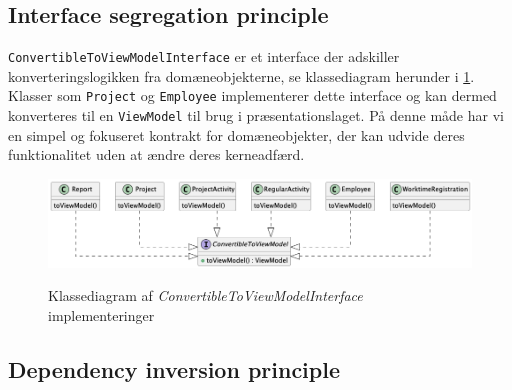 \subsection{Interface segregation principle} \label{sec:solid_i}
\texttt{ConvertibleToViewModelInterface} er et interface der adskiller konverteringslogikken fra domæneobjekterne, se klassediagram herunder i \ref{fig:class_convertible_example}. Klasser som \texttt{Project} og \texttt{Employee} implementerer dette interface og kan dermed konverteres til en \texttt{ViewModel} til brug i præsentationslaget. På denne måde har vi en simpel og fokuseret kontrakt for domæneobjekter, der kan udvide deres funktionalitet uden at ændre deres kerneadfærd. 

\begin{figure}[H]
    \centering
    \caption{Klassediagram af \textit{ConvertibleToViewModelInterface} implementeringer}
    \includegraphics[width = \textwidth, keepaspectratio]{TaskFusion/out/assets/diagrams/class_convertibleToViewModel_example/ConvertibleToViewModel_diagram.png}
    \label{fig:class_convertible_example}
\end{figure}

\subsection{Dependency inversion principle} \label{sec:solid_d}


